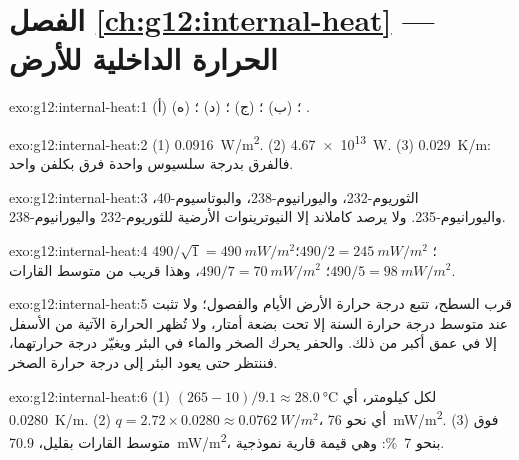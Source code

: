 \section*{الفصل \ref{ch:g12:internal-heat} --- الحرارة الداخلية للأرض}

\begin{solution}{exo:g12:internal-heat:1}
(أ) ؛ (ب) ؛ (ج) ؛
(د) ؛ (ه) .
\end{solution}

\begin{solution}{exo:g12:internal-heat:2}
(1) \qty{0.0916}{W/m^2}. (2) \qty{4.67e13}{W}. (3) \qty{0.029}{K/m}: فالفرق
بدرجة سلسيوس واحدة فرق بكلفن واحد.
\end{solution}

\begin{solution}{exo:g12:internal-heat:3}
الثوريوم-232، واليورانيوم-238، والبوتاسيوم-40، واليورانيوم-235. ولا يرصد كاملاند
إلا النيوترينوات الأرضية للثوريوم-232 واليورانيوم-238.
\end{solution}

\begin{solution}{exo:g12:internal-heat:4}
$490/\sqrt{1} = \qty{490}{mW/m^2}$؛ $490/2 = \qty{245}{mW/m^2}$؛
$490/5 = \qty{98}{mW/m^2}$؛ $490/7 = \qty{70}{mW/m^2}$، وهذا قريب من متوسط
القارات.
\end{solution}

\begin{solution}{exo:g12:internal-heat:5}
قرب السطح، تتبع درجة حرارة الأرض الأيام
والفصول؛ ولا تثبت عند متوسط درجة حرارة السنة إلا تحت بضعة أمتار،
ولا تُظهر الحرارة الآتية من الأسفل إلا في عمق أكبر من ذلك.
والحفر يحرك الصخر والماء في البئر ويغيّر
درجة حرارتهما، فننتظر حتى يعود البئر إلى درجة حرارة
الصخر.
\end{solution}

\begin{solution}{exo:g12:internal-heat:6}
(1) $(265 - 10)/9.1 \approx \qty{28.0}{\celsius}$ لكل كيلومتر، أي
\qty{0.0280}{K/m}. (2) $q = 2.72 \times 0.0280 \approx \qty{0.0762}{W/m^2}$،
أي نحو \qty{76}{mW/m^2}. (3) فوق متوسط القارات بقليل،
\qty{70.9}{mW/m^2}، بنحو \qty{7}{\percent}: وهي قيمة قارية نموذجية.
\end{solution}

